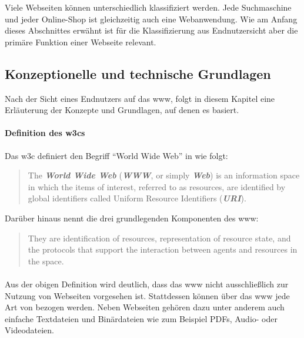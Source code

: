             Viele Webseiten können unterschiedlich klassifiziert werden.
            Jede Suchmaschine und jeder Online-Shop ist gleichzeitig auch eine
            Webanwendung. Wie am Anfang dieses Abschnittes erwähnt ist für die
            Klassifizierung aus Endnutzersicht aber die primäre Funktion einer Webseite
            relevant.

        \subsection{Konzeptionelle und technische Grundlagen}
            Nach der Sicht eines Endnutzers auf das \gls{www},
            folgt in diesem Kapitel eine Erläuterung der Konzepte und Grundlagen,
            auf denen es basiert.

            \paragraph*{Definition des \glspl{w3c}}
            Das \gls{w3c} definiert den Begriff "`World Wide Web"' in \cite{w3c:wwwArch} wie folgt:
    
            \begin{quote}
                The \textit{\textbf{World Wide Web}} (\textit{\textbf{WWW}}, or simply \textit{\textbf{Web}})
                is an information space in which the items of interest, referred to as resources,
                are identified by global identifiers called Uniform Resource Identifiers (\textit{\textbf{URI}}).
            \end{quote}

            Darüber hinaus nennt \cite{w3c:wwwArch} die drei grundlegenden Komponenten des \gls{www}:

            \begin{quote}
                They are identification of resources,
                representation of resource state, and the protocols
                that support the interaction between agents and resources in the space.
            \end{quote}

            \paragraph*{\resources}
            Aus der obigen Definition wird deutlich,
            dass das \gls{www} nicht ausschließlich zur Nutzung von Webseiten
            vorgesehen ist.
            Stattdessen können über das \gls{www} jede Art von \resources bezogen werden.
            Neben Webseiten gehören dazu unter anderem auch einfache Textdateien
            und Binärdateien wie zum Beispiel PDFs, Audio- oder Videodateien.

